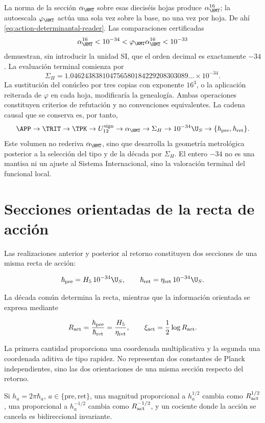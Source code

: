 La norma de la secci\'on \(\alpha_{\HMT}\) sobre esas diecis\'eis hojas
produce \(\alpha_{\HMT}^{16}\); la autoescala \(\varphi_{\HMT}\) act\'ua
una sola vez sobre la base, no una vez por hoja. De ah\'i
\cref{eq:action-determinantal-reader}. Las comparaciones certificadas
\begin{equation}
\alpha_{\HMT}^{16}<10^{-34}
<\varphi_{\HMT}\alpha_{\HMT}^{16}<10^{-33}
\label{eq:action-decade-bounds}
\end{equation}
demuestran, sin introducir la unidad SI, que el orden decimal es
exactamente \(-34\). La evaluaci\'on terminal comienza por
\begin{equation}
\Sigma_H
=1.046243838104756580184229208303089\ldots\times10^{-34}.
\label{eq:action-sigma-value}
\end{equation}
La sustituci\'on del con\'ucleo por tres copias con exponente \(16^3\), o la
aplicaci\'on reiterada de \(\varphi\) en cada hoja, modificar\'ia la
genealog\'ia. Ambas operaciones constituyen criterios de refutaci\'on y no
convenciones equivalentes.
La cadena causal que se conserva es, por tanto,
\[
\APP\to\TRIT\to\TPK\to U_{12}^{\rm sign}
\to\alpha_{\HMT}\to\Sigma_H
\to10^{-34}\U_S\to
\{\hbar_{\rm pre},\hbar_{\rm ret}\}.
\]
Este volumen no rederiva \(\alpha_{\HMT}\), sino que desarrolla la geometr\'ia
metrol\'ogica posterior a la selecci\'on del tipo y de la d\'ecada por
\(\Sigma_H\). El entero \(-34\) no es una mantisa ni un ajuste al Sistema
Internacional, sino la valoraci\'on terminal del funcional local.

\section{Secciones orientadas de la recta de acci\'on}

Las realizaciones anterior y posterior al retorno constituyen dos secciones
de una misma recta de acci\'on:

\begin{equation}
\hbar_{\rm pre}=H_5\,10^{-34}\U_S,\qquad
\hbar_{\rm ret}=\eta_{\rm ret}\,10^{-34}\U_S.
\label{eq:action-twoway}
\end{equation}

La d\'ecada com\'un determina la recta, mientras que la informaci\'on
orientada se expresa mediante

\begin{equation}
R_{\rm act}=\frac{\hbar_{\rm pre}}{\hbar_{\rm ret}}
=\frac{H_5}{\eta_{\rm ret}},
\qquad
\xi_{\rm act}=\frac12\log R_{\rm act}.
\label{eq:action-rapidity}
\end{equation}

La primera cantidad proporciona una coordenada multiplicativa y la segunda
una coordenada aditiva de tipo rapidez. No representan dos constantes de
Planck independientes, sino las dos orientaciones de una misma secci\'on
respecto del retorno.

Si \(h_a=2\pi\hbar_a\), \(a\in\{\mathrm{pre},\mathrm{ret}\}\), una magnitud proporcional a \(h_a^{1/2}\) cambia como \(R_{\rm act}^{1/2}\), una proporcional a \(h_a^{-1/2}\) cambia como \(R_{\rm act}^{-1/2}\), y un cociente donde la acci\'on se cancela es bidireccional invariante.

